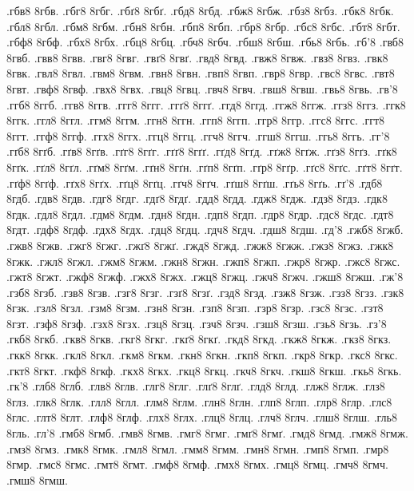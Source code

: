 {.гбв8
8гбв.
.гбг8
8гбг.
.гбґ8
8гбґ.
.гбд8
8гбд.
.гбж8
8гбж.
.гбз8
8гбз.
.гбк8
8гбк.
.гбл8
8гбл.
.гбм8
8гбм.
.гбн8
8гбн.
.гбп8
8гбп.
.гбр8
8гбр.
.гбс8
8гбс.
.гбт8
8гбт.
.гбф8
8гбф.
.гбх8
8гбх.
.гбц8
8гбц.
.гбч8
8гбч.
.гбш8
8гбш.
.гбь8
8гбь.
.гб'8
.гвб8
8гвб.
.гвв8
8гвв.
.гвг8
8гвг.
.гвґ8
8гвґ.
.гвд8
8гвд.
.гвж8
8гвж.
.гвз8
8гвз.
.гвк8
8гвк.
.гвл8
8гвл.
.гвм8
8гвм.
.гвн8
8гвн.
.гвп8
8гвп.
.гвр8
8гвр.
.гвс8
8гвс.
.гвт8
8гвт.
.гвф8
8гвф.
.гвх8
8гвх.
.гвц8
8гвц.
.гвч8
8гвч.
.гвш8
8гвш.
.гвь8
8гвь.
.гв'8
.ггб8
8ггб.
.ггв8
8ггв.
.ггг8
8ггг.
.ггґ8
8ггґ.
.ггд8
8ггд.
.ггж8
8ггж.
.ггз8
8ггз.
.ггк8
8ггк.
.ггл8
8ггл.
.ггм8
8ггм.
.ггн8
8ггн.
.ггп8
8ггп.
.ггр8
8ггр.
.ггс8
8ггс.
.ггт8
8ггт.
.ггф8
8ггф.
.ггх8
8ггх.
.ггц8
8ггц.
.ггч8
8ггч.
.ггш8
8ггш.
.ггь8
8ггь.
.гг'8
.гґб8
8гґб.
.гґв8
8гґв.
.гґг8
8гґг.
.гґґ8
8гґґ.
.гґд8
8гґд.
.гґж8
8гґж.
.гґз8
8гґз.
.гґк8
8гґк.
.гґл8
8гґл.
.гґм8
8гґм.
.гґн8
8гґн.
.гґп8
8гґп.
.гґр8
8гґр.
.гґс8
8гґс.
.гґт8
8гґт.
.гґф8
8гґф.
.гґх8
8гґх.
.гґц8
8гґц.
.гґч8
8гґч.
.гґш8
8гґш.
.гґь8
8гґь.
.гґ'8
.гдб8
8гдб.
.гдв8
8гдв.
.гдг8
8гдг.
.гдґ8
8гдґ.
.гдд8
8гдд.
.гдж8
8гдж.
.гдз8
8гдз.
.гдк8
8гдк.
.гдл8
8гдл.
.гдм8
8гдм.
.гдн8
8гдн.
.гдп8
8гдп.
.гдр8
8гдр.
.гдс8
8гдс.
.гдт8
8гдт.
.гдф8
8гдф.
.гдх8
8гдх.
.гдц8
8гдц.
.гдч8
8гдч.
.гдш8
8гдш.
.гд'8
.гжб8
8гжб.
.гжв8
8гжв.
.гжг8
8гжг.
.гжґ8
8гжґ.
.гжд8
8гжд.
.гжж8
8гжж.
.гжз8
8гжз.
.гжк8
8гжк.
.гжл8
8гжл.
.гжм8
8гжм.
.гжн8
8гжн.
.гжп8
8гжп.
.гжр8
8гжр.
.гжс8
8гжс.
.гжт8
8гжт.
.гжф8
8гжф.
.гжх8
8гжх.
.гжц8
8гжц.
.гжч8
8гжч.
.гжш8
8гжш.
.гж'8
.гзб8
8гзб.
.гзв8
8гзв.
.гзг8
8гзг.
.гзґ8
8гзґ.
.гзд8
8гзд.
.гзж8
8гзж.
.гзз8
8гзз.
.гзк8
8гзк.
.гзл8
8гзл.
.гзм8
8гзм.
.гзн8
8гзн.
.гзп8
8гзп.
.гзр8
8гзр.
.гзс8
8гзс.
.гзт8
8гзт.
.гзф8
8гзф.
.гзх8
8гзх.
.гзц8
8гзц.
.гзч8
8гзч.
.гзш8
8гзш.
.гзь8
8гзь.
.гз'8
.гкб8
8гкб.
.гкв8
8гкв.
.гкг8
8гкг.
.гкґ8
8гкґ.
.гкд8
8гкд.
.гкж8
8гкж.
.гкз8
8гкз.
.гкк8
8гкк.
.гкл8
8гкл.
.гкм8
8гкм.
.гкн8
8гкн.
.гкп8
8гкп.
.гкр8
8гкр.
.гкс8
8гкс.
.гкт8
8гкт.
.гкф8
8гкф.
.гкх8
8гкх.
.гкц8
8гкц.
.гкч8
8гкч.
.гкш8
8гкш.
.гкь8
8гкь.
.гк'8
.глб8
8глб.
.глв8
8глв.
.глг8
8глг.
.глґ8
8глґ.
.глд8
8глд.
.глж8
8глж.
.глз8
8глз.
.глк8
8глк.
.глл8
8глл.
.глм8
8глм.
.глн8
8глн.
.глп8
8глп.
.глр8
8глр.
.глс8
8глс.
.глт8
8глт.
.глф8
8глф.
.глх8
8глх.
.глц8
8глц.
.глч8
8глч.
.глш8
8глш.
.гль8
8гль.
.гл'8
.гмб8
8гмб.
.гмв8
8гмв.
.гмг8
8гмг.
.гмґ8
8гмґ.
.гмд8
8гмд.
.гмж8
8гмж.
.гмз8
8гмз.
.гмк8
8гмк.
.гмл8
8гмл.
.гмм8
8гмм.
.гмн8
8гмн.
.гмп8
8гмп.
.гмр8
8гмр.
.гмс8
8гмс.
.гмт8
8гмт.
.гмф8
8гмф.
.гмх8
8гмх.
.гмц8
8гмц.
.гмч8
8гмч.
.гмш8
8гмш.
}

